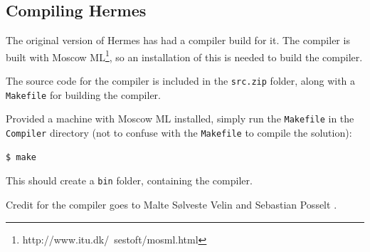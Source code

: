 





\subsection{Compiling Hermes}
\label{HC}
The original version of Hermes has had a compiler build for it. The compiler is built with Moscow ML\footnote{http://www.itu.dk/~sestoft/mosml.html}, so an installation of this is needed to build the compiler.

The source code for the compiler is included in the \texttt{src.zip} folder, along with a \texttt{Makefile} for building the compiler.

Provided a machine with Moscow ML installed, simply run the \texttt{Makefile} in the \texttt{Compiler} directory (not to confuse with the \texttt{Makefile} to compile the solution):
\begin{lstlisting}[language=C]
  $ make
\end{lstlisting}%
This should create a \texttt{bin} folder, containing the compiler. 

Credit for the compiler goes to Malte Sølveste Velin and Sebastian Posselt \cite{Compiler}.
